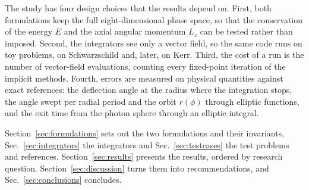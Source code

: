 The study has four design choices that the results depend on. First, both formulations keep
the full eight-dimensional phase space, so that the conservation of the energy $E$ and the
axial angular momentum $L_z$ can be tested rather than imposed. Second, the integrators see
only a vector field, so the same code runs on toy problems, on Schwarzschild and, later, on
Kerr. Third, the cost of a run is the number of vector-field evaluations, counting every
fixed-point iteration of the implicit methods. Fourth, errors are measured on physical
quantities against exact references: the deflection angle at the radius where the
integration stops, the angle swept per radial period and the orbit $r(\phi)$ through elliptic
functions, and the exit time from the photon sphere through an elliptic integral.

Section~\ref{sec:formulations} sets out the two formulations and their invariants,
Sec.~\ref{sec:integrators} the integrators and Sec.~\ref{sec:testcases} the test problems and
references. Section~\ref{sec:results} presents the results, ordered by research question.
Section~\ref{sec:discussion} turns them into recommendations, and Sec.~\ref{sec:conclusions}
concludes.
